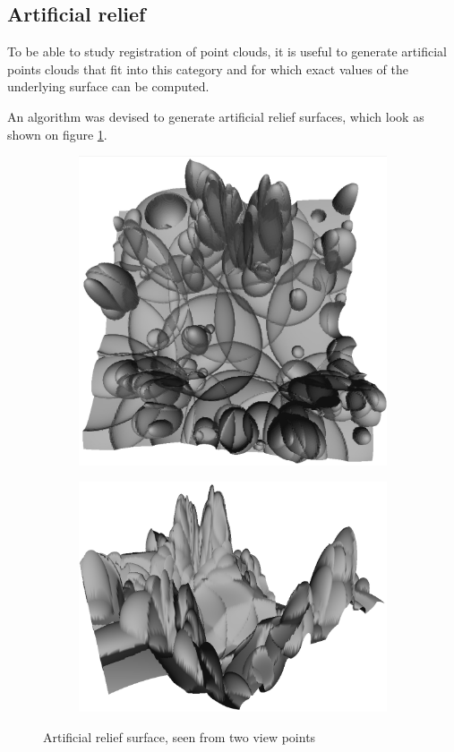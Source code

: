 \subsection{Artificial relief} \label{sec:art_relief}
To be able to study registration of point clouds, it is useful to generate artificial points clouds that fit into this category and for which exact values of the underlying surface can be computed.

An algorithm was devised to generate artificial relief surfaces, which look as shown on figure \ref{fig:relief_render}.

\begin{figure}[H]
\centering
\begin{subfigure}{.5\textwidth}
\includegraphics[width=\linewidth]{fig/r1_render2.jpg}
\end{subfigure}%
\begin{subfigure}{.5\textwidth}
\includegraphics[width=\linewidth]{fig/r1_render1.jpg}
\end{subfigure}
\caption{Artificial relief surface, seen from two view points}
\label{fig:relief_render}
\end{figure}

